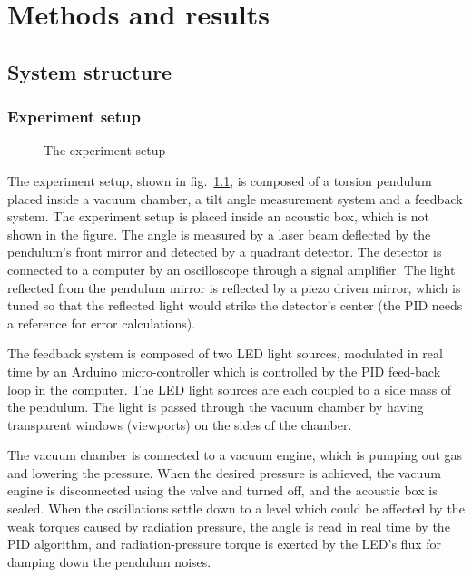 \documentclass[\main/master.tex]{subfiles}
\begin{document}
\chapter{Methods and results}\label{chapter:Methods and results}

\section{System structure}
\subsection{Experiment setup}
\begin{figure}[htbp]
	\centering
	\caption[The experiment setup]{The experiment setup}
	\label{fig:setup}
\end{figure}
\FloatBarrier
\par\noindent
The experiment setup, shown in fig.~\ref{fig:setup}, is composed of a torsion pendulum placed inside a vacuum chamber, a tilt angle measurement system and a feedback system. The experiment setup is placed inside an acoustic box, which is not shown in the figure. The angle is measured by a laser beam deflected by the pendulum's front mirror and detected by a quadrant detector. The detector is connected to a computer by an oscilloscope through a signal amplifier. The light reflected from the pendulum mirror is reflected by a piezo driven mirror, which is tuned so that the reflected light would strike the detector's center (the PID needs a reference for error calculations). 
\par\noindent
The feedback system is composed of two LED light sources, modulated in real time by an Arduino micro-controller which is controlled by the PID feed-back loop in the computer. The LED light sources are each coupled to a side mass of the pendulum. The light is passed through the vacuum chamber by having transparent windows (viewports) on the sides of the chamber. 
\par\noindent
The vacuum chamber is connected to a vacuum engine, which is pumping out gas and lowering the pressure. When the desired pressure is achieved, the vacuum engine is disconnected using the valve and turned off, and the acoustic box is sealed. When the oscillations settle down to a level which could be affected by the weak torques caused by radiation pressure, the angle is read in real time by the PID algorithm, and radiation-pressure torque is exerted by the LED's flux for damping down the pendulum noises.
\end{document}

